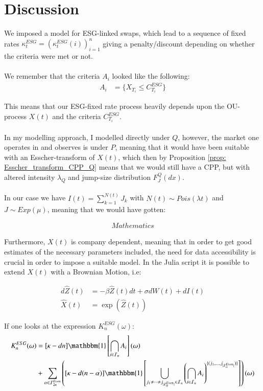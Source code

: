 \chapter{Discussion}

We imposed a model for ESG-linked swaps, which lead to a sequence of fixed rates $\kappa_{t}^{ESG}  = (\kappa_{t}^{ESG}(i))_{i=1}^{n}$ giving a penalty/discount depending on whether the criteria were met or not.
\\~\\ 
We remember that the criteria $A_{i}$ looked like the following:
\begin{align*}
A_{i} &= \{X_{T_{i}} \leq C_{T_{i}}^{ESG}\}    
\end{align*}

This means that our ESG-fixed rate process heavily depends upon the OU-process $X(t)$ and the criteria $C_{T_{i}}^{ESG}$. 
\\~\\
In my modelling approach, I modelled directly under $Q$, however, the market one operates in and observes is under $P$, meaning that it would have been suitable with an Esscher-transform of $X(t)$, which then by  Proposition \ref{prop: Esscher_transform_CPP_Q} means that we would still have a CPP, but with altered intensity $\lambda_{Q}$ and jump-size distribution $F_{J}^{Q}(dx)$.
\\~\\
In our case we have $I(t) = \sum_{k=1}^{N(t)}J_{k}$ with $N(t) \sim Pois(\lambda t)$ and 
$J\sim Exp(\mu)$, meaning that we would have gotten: 

\begin{align*}
Mathematics
\end{align*}

Furthermore, $X(t)$ is company dependent, meaning that in order to get good estimates of the necessary parameters included, the need for data accessibility is crucial in order to impose a suitable model. In the Julia script it is possible to extend $X(t)$ with a Brownian Motion, i.e: 

\begin{align*}
d\hat{Z}(t) &= -\beta \hat{Z}(t)dt + \sigma dW(t) + dI(t)\\ 
\hat{X}(t) &= \exp\left(\hat{Z}(t)\right)
\end{align*}


\newpage 
If one looks at the expression $K_{n}^{ESG}(\omega)$: 
\begin{align*}
K_{n}^{ESG}(\omega) &= 
[\kappa -dn]\mathbbm{1}\left[
\bigcap_{i\in \mathcal{I}_{n}}A_{i}
\right](\omega) \\ 
&+ 
\sum_{\alpha \in \mathcal{I}_{2n}^{Even}}
\left(
[\kappa -d(n-\alpha)]\mathbbm{1}\left[
\bigcup_{
j_{1}\neq \dots \neq j_{|\mathcal{I}_{\alpha}^{Even}|}
\in \mathcal{I}_{n}
}\left(
\bigcap_{i\in \mathcal{I}_{n}}A_{i}
\right)^{
\{
(j_{1}, \dots , j_{|\mathcal{I}_{\alpha}^{Even}|})
\}
}
\right]
\right)(\omega) 
\end{align*}

